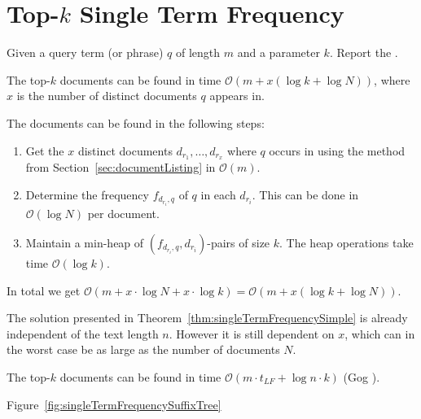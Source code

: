 \section{Top-$k$ Single Term Frequency}

\begin{Definition}
  Given a query term (or phrase) $q$ of length $m$ and a parameter $k$. Report the .
\end{Definition}

\begin{Theorem}
  \label{thm:singleTermFrequencySimple}
  The top-$k$ documents can be found in time $\mathcal{O}(m + x(\log k + \log N))$, where $x$ is the number of distinct documents $q$ appears in.
\end{Theorem}

\begin{Proof}
  The documents can be found in the following steps:
  \begin{enumerate}
    \item Get the $x$ distinct documents $d_{r_1}, \ldots, d_{r_x}$ where $q$ occurs in using the method from Section~\ref{sec:documentListing} in $\mathcal{O}(m)$.
    \item Determine the frequency $f_{d_{r_i},q}$ of $q$ in each $d_{r_i}$. This can be done in $\mathcal{O}(\log N)$ per document.
    \item Maintain a min-heap of $(f_{d_{r_i},q}, d_{r_i})$-pairs of size $k$. The heap operations take time $\mathcal{O}(\log k)$.
  \end{enumerate}
  In total we get $\mathcal{O}(m + x \cdot \log N + x \cdot \log k) = \mathcal{O}(m + x(\log k + \log N))$.
\end{Proof}

The solution presented in Theorem~\ref{thm:singleTermFrequencySimple} is already independent of the text length $n$. However it is still dependent on $x$, which can in the worst case be as large as the number of documents $N$.

\begin{Theorem}
  The top-$k$ documents can be found in time $\mathcal{O}(m \cdot t_{LF} + \log n\cdot k)$ (Gog \cite{Gog2015}).
\end{Theorem}

\begin{Proof}
  Figure~\ref{fig:singleTermFrequencySuffixTree}
\end{Proof}

